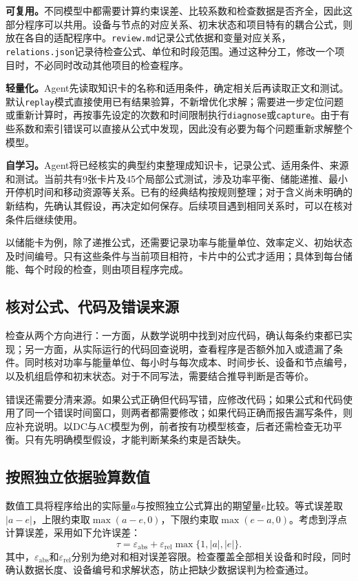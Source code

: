\documentclass[chinese]{iarticle}
\begin{document}
\textbf{可复用。}不同模型中都需要计算约束误差、比较系数和检查数据是否齐全，因此这部分程序可以共用。设备与节点的对应关系、初末状态和项目特有的耦合公式，则放在各自的适配程序中。\texttt{review.md}记录公式依据和变量对应关系，\texttt{relations.json}记录待检查公式、单位和时段范围。通过这种分工，修改一个项目时，不必同时改动其他项目的检查程序。

\textbf{轻量化。}Agent先读取知识卡的名称和适用条件，确定相关后再读取正文和测试。默认\texttt{replay}模式直接使用已有结果验算，不新增优化求解；需要进一步定位问题或重新计算时，再按事先设定的次数和时间限制执行\texttt{diagnose}或\texttt{capture}。由于有些系数和索引错误可以直接从公式中发现，因此没有必要为每个问题重新求解整个模型。

\textbf{自学习。}Agent将已经核实的典型约束整理成知识卡，记录公式、适用条件、来源和测试。当前共有9张卡片及45个局部公式测试，涉及功率平衡、储能递推、最小开停机时间和移动资源等关系。已有的经典结构按规则整理；对于含义尚未明确的新结构，先确认其假设，再决定如何保存。后续项目遇到相同关系时，可以在核对条件后继续使用。

以储能卡为例，除了递推公式，还需要记录功率与能量单位、效率定义、初始状态及时间编号。只有这些条件与当前项目相符，卡片中的公式才适用；具体到每台储能、每个时段的检查，则由项目程序完成。

\subsection{核对公式、代码及错误来源}

检查从两个方向进行：一方面，从数学说明中找到对应代码，确认每条约束都已实现；另一方面，从实际运行的代码回查说明，查看程序是否额外加入或遗漏了条件。同时核对功率与能量单位、每小时与每次成本、时间步长、设备和节点编号，以及机组启停和初末状态。对于不同写法，需要结合推导判断是否等价。

错误还需要分清来源。如果公式正确但代码写错，应修改代码；如果公式和代码使用了同一个错误时间窗口，则两者都需要修改；如果代码正确而报告漏写条件，则应补充说明。以DC与AC模型为例，前者按有功模型核查，后者还需检查无功平衡。只有先明确模型假设，才能判断某条约束是否缺失。

\subsection{按照独立依据验算数值}

数值工具将程序给出的实际量$a$与按照独立公式算出的期望量$e$比较。等式误差取$|a-e|$，上限约束取$\max(a-e,0)$，下限约束取$\max(e-a,0)$。考虑到浮点计算误差，采用如下允许误差：
\begin{equation}
  \tau=\varepsilon_{\mathrm{abs}}+
  \varepsilon_{\mathrm{rel}}\max\{1,|a|,|e|\}.
\end{equation}
其中，$\varepsilon_{\mathrm{abs}}$和$\varepsilon_{\mathrm{rel}}$分别为绝对和相对误差容限。检查覆盖全部相关设备和时段，同时确认数据长度、设备编号和求解状态，防止把缺少数据误判为检查通过。
\end{document}
